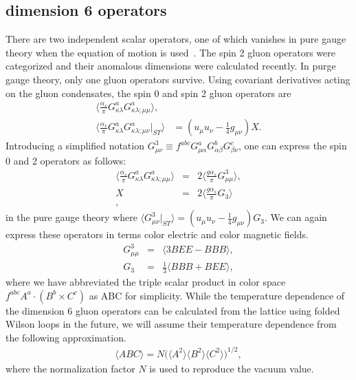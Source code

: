 \documentclass[aps,prc,superscriptaddress,showpacs,floatfix, nofootinbib,preprintnumbers,twocolumn]{revtex4}
\begin{document}
\subsection{dimension 6 operators}

There are two independent scalar operators, one of which vanishes in pure gauge theory when the equation of motion is used~\cite{Nikolaev:1982rq}.  
The spin 2 gluon operators were categorized\cite{Kim:2000kj,Kim:2015ywa} and their anomalous dimensions were calculated recently\cite{Kim:2015ywa}.  In purge gauge theory, only one gluon operators survive.  Using covariant derivatives acting on the gluon condensates, the spin 0 and spin 2 gluon operators are 
\begin{eqnarray}
\langle\frac{\alpha_s}{\pi} G^a_{\kappa \lambda} G^a_{\kappa \lambda; \mu \mu} \rangle,&\nonumber\\
\langle\frac{\alpha_s}{\pi} G^a_{\kappa \lambda} G^a_{\kappa \lambda; \mu \nu} |_{ST}\rangle & = ( u_\mu u_\nu -\frac{1}{4} g_{\mu \nu} ) X .
\end{eqnarray}
 Introducing a simplified notation $G^3_{\mu \nu} \equiv f^{abc} G^a_{\mu \alpha}G^b_{\alpha \beta} G^c_{\beta \nu}$, one can express the spin 0 and 2 operators as follows:
\begin{eqnarray}
\langle\frac{\alpha_s}{\pi} G^a_{\kappa \lambda} G^a_{\kappa \lambda; \mu \mu} \rangle & = &    2\langle \frac{g\alpha_s}{\pi} G^3_{\mu \mu} \rangle,
\nonumber \\
X & = &   2\langle\frac{g\alpha_s}{\pi} G_3 \rangle\\,
\nonumber
\end{eqnarray}
in the pure gauge theory where $\langle G^3_{\mu\nu}|_{ST}\rangle = ( u_\mu u_\nu -\frac{1}{4} g_{\mu \nu} )G_3$.  We can again express these operators in terms color electric and color magnetic fields.
\begin{eqnarray}
G^3_{\mu \mu} & = & \langle 3BEE -BBB \rangle, \nonumber \\
G_3 & = &  \frac{1}{3} \langle BBB+BEE \rangle, 
\label{ABC}
\end{eqnarray}
where we have abbreviated the triple scalar product in color space $f^{abc} A^a \cdot (B^b \times C^c )$ as ABC for simplicity.  
While the temperature dependence of the dimension 6 gluon operators can be calculated from the lattice using folded Wilson loops in the future, we will assume their temperature dependence from the following approximation.
\begin{eqnarray}
\langle ABC \rangle = N \bigg( \langle A^2 \rangle \langle B^2 \rangle \langle C^2 \rangle \bigg)^{1/2},
\end{eqnarray}
where the normalization factor $N$ is used to reproduce the vacuum value.
\end{document}
